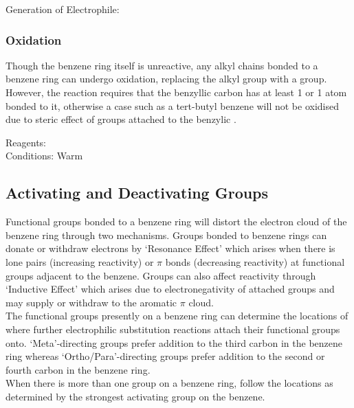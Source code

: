 \documentclass[../main]{subfiles}
\begin{document}
	Generation of Electrophile:  \\

	\subsubsection{Oxidation}

	Though the benzene ring itself is unreactive, any alkyl chains bonded to a benzene ring can undergo oxidation, replacing the alkyl group with a  group. However, the reaction requires that the benzyllic carbon has at least 1  or 1  atom bonded to it, otherwise a case such as a tert-butyl benzene will not be oxidised due to steric effect of  groups attached to the benzylic .

	Reagents:  \\
	Conditions: Warm \\

	\subsection{Activating and Deactivating Groups}

	Functional groups bonded to a benzene ring will distort the electron cloud of the benzene ring through two mechanisms. 
	Groups bonded to benzene rings can donate or withdraw electrons by `Resonance Effect' which arises when there is lone pairs (increasing reactivity) or \(\pi\) bonds (decreasing reactivity) at functional groups adjacent to the benzene. Groups can also affect reactivity through `Inductive Effect' which arises due to electronegativity of attached groups and may supply or withdraw  to the aromatic \(\pi\)  cloud. \\

	The functional groups presently on a benzene ring can determine the locations of where further electrophilic substitution reactions attach their functional groups onto. `Meta'-directing groups prefer addition to the third carbon in the benzene ring whereas `Ortho/Para'-directing groups prefer addition to the second or fourth carbon in the benzene ring. \\

	When there is more than one group on a benzene ring, follow the locations as determined by the strongest activating group on the benzene.
	
\end{document}
